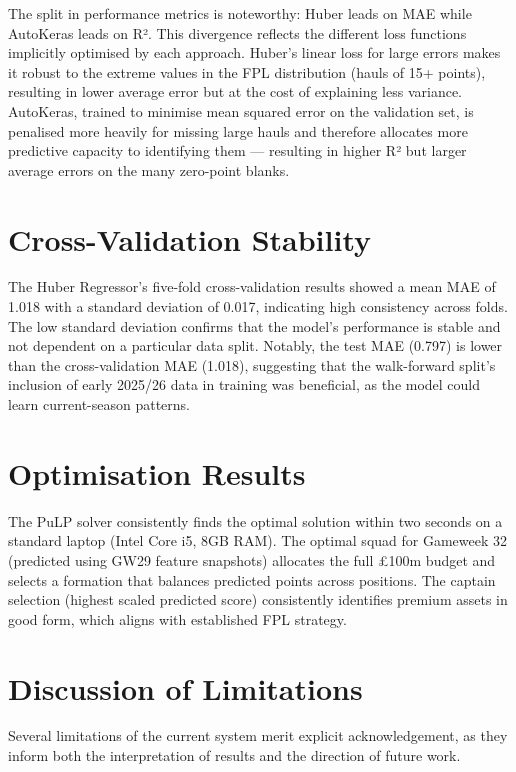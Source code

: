 \documentclass[11pt,english,listoffigures,listoftables]{tfgetsinf}
\begin{document}
The split in performance metrics is noteworthy: Huber leads on MAE while AutoKeras leads on R². This divergence reflects the different loss functions implicitly optimised by each approach. Huber's linear loss for large errors makes it robust to the extreme values in the FPL distribution (hauls of 15+ points), resulting in lower average error but at the cost of explaining less variance. AutoKeras, trained to minimise mean squared error on the validation set, is penalised more heavily for missing large hauls and therefore allocates more predictive capacity to identifying them --- resulting in higher R² but larger average errors on the many zero-point blanks.

\section{Cross-Validation Stability}

The Huber Regressor's five-fold cross-validation results showed a mean MAE of 1.018 with a standard deviation of 0.017, indicating high consistency across folds. The low standard deviation confirms that the model's performance is stable and not dependent on a particular data split. Notably, the test MAE (0.797) is lower than the cross-validation MAE (1.018), suggesting that the walk-forward split's inclusion of early 2025/26 data in training was beneficial, as the model could learn current-season patterns.

\section{Optimisation Results}

The PuLP solver consistently finds the optimal solution within two seconds on a standard laptop (Intel Core i5, 8GB RAM). The optimal squad for Gameweek 32 (predicted using GW29 feature snapshots) allocates the full £100m budget and selects a formation that balances predicted points across positions. The captain selection (highest scaled predicted score) consistently identifies premium assets in good form, which aligns with established FPL strategy.

\section{Discussion of Limitations}

Several limitations of the current system merit explicit acknowledgement, as they inform both the interpretation of results and the direction of future work.
\end{document}
